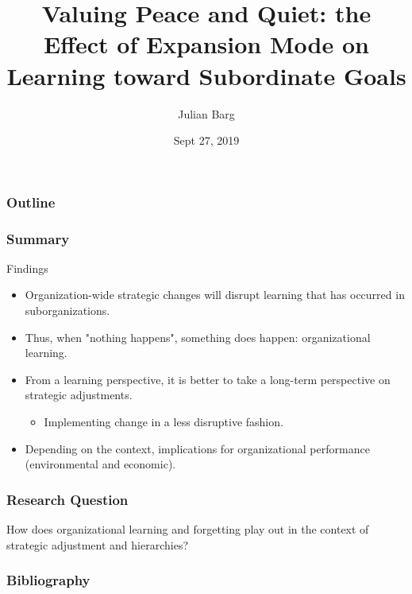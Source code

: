 \documentclass{beamer}
\title{Valuing Peace and Quiet: the Effect of Expansion Mode on Learning toward Subordinate Goals}
\author{Julian Barg}
\institute{Ivey Business School}
\date{Sept 27, 2019}
\begin{document}
	
\frame{\titlepage}

\begin{frame}
	\frametitle{Outline}
	\tableofcontents
\end{frame}

\begin{frame}
	\frametitle{Summary}
	\begin{block}{Findings}
		\begin{itemize}
			\item Organization-wide strategic changes will disrupt learning that has occurred in suborganizations.
			\item Thus, when "nothing happens", something does happen: organizational learning.
			\item From a learning perspective, it is better to take a long-term perspective on strategic adjustments.
				\begin{itemize}
					\item Implementing change in a less disruptive fashion.
				\end{itemize}
			\item Depending on the context, implications for organizational performance (environmental and economic).
		\end{itemize}
	\end{block}
\end{frame}





\begin{frame}
	\frametitle{Research Question}
	How does organizational learning and forgetting play out in the context of strategic adjustment and hierarchies?
\end{frame}



\begin{frame}[allowframebreaks]
	\frametitle{Bibliography}
	
	
\end{frame}
\end{document}
